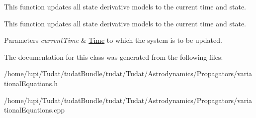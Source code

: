 This function updates all state derivative models to the current time and state. 

This function updates all state derivative models to the current time and state. 
\begin{DoxyParams}{Parameters}
{\em current\+Time} & \hyperlink{classtudat_1_1Time}{Time} to which the system is to be updated. \\
\hline
\end{DoxyParams}


The documentation for this class was generated from the following files\+:\begin{DoxyCompactItemize}
\item 
/home/lupi/\+Tudat/tudat\+Bundle/tudat/\+Tudat/\+Astrodynamics/\+Propagators/variational\+Equations.\+h\item 
/home/lupi/\+Tudat/tudat\+Bundle/tudat/\+Tudat/\+Astrodynamics/\+Propagators/variational\+Equations.\+cpp\end{DoxyCompactItemize}
